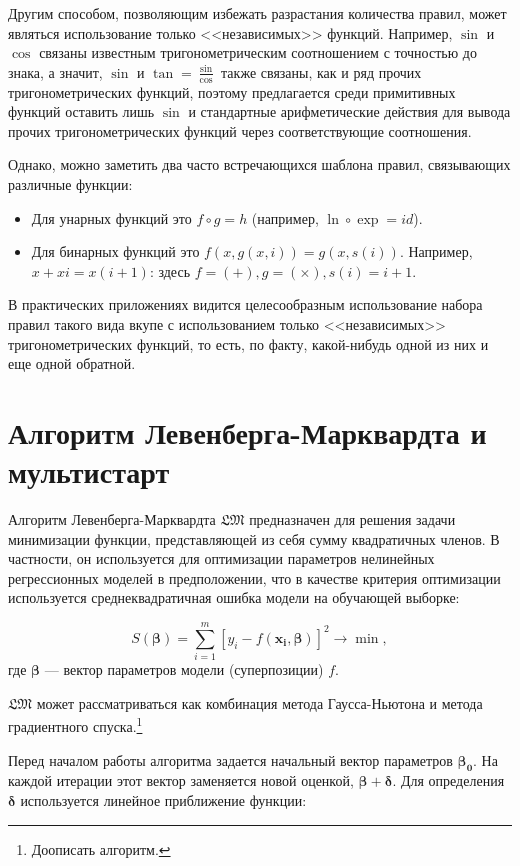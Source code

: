 \documentclass[12pt,a4paper]{amsart}
\begin{document}
Другим способом, позволяющим избежать разрастания количества правил, может
являться использование только <<независимых>> функций. Например, $\sin$ и
$\cos$ связаны известным тригонометрическим соотношением с точностью до знака,
а значит, $\sin$ и $\tan = \frac{\sin}{\cos}$ также связаны, как и ряд прочих
тригонометрических функций, поэтому предлагается среди примитивных функций
оставить лишь $\sin$ и стандартные арифметические действия для вывода прочих
тригонометрических функций через соответствующие соотношения.

Однако, можно заметить два часто встречающихся шаблона правил, связывающих
различные функции:
\begin{itemize}
  \item Для унарных функций это $f \circ g = h$ (например,
	$\ln \circ \exp = id$).
  \item Для бинарных функций это $ f (x, g (x, i)) = g (x, s (i)) $.
	Например, $x + xi = x(i+1)$: здесь $f = (+), g = (\times), s(i) = i + 1$.
\end{itemize}

В практических приложениях видится целесообразным использование набора правил
такого вида вкупе с использованием только <<независимых>> тригонометрических
функций, то есть, по факту, какой-нибудь одной из них и еще одной обратной.

\section{Алгоритм Левенберга-Марквардта и мультистарт}

Алгоритм Левенберга-Марквардта $\mathfrak{LM}$ предназначен для решения
задачи минимизации функции, представляющей из себя сумму квадратичных членов.
В частности, он используется для оптимизации параметров нелинейных регрессионных
моделей в предположении, что в качестве критерия оптимизации используется
среднеквадратичная ошибка модели на обучающей выборке:

\[
S(\mathbf{\beta}) = \sum_{i=1}^{m} [y_i - f(\mathbf{x_i}, \mathbf{\beta})]^2 \to \min,
\]
где $\mathbf{\beta}$ --- вектор параметров модели (суперпозиции) $f$.

$\mathfrak{LM}$ может рассматриваться как комбинация метода Гаусса-Ньютона и
метода градиентного спуска.\footnote{Доописать алгоритм.}

Перед началом работы алгоритма задается начальный вектор параметров $\mathbf{\beta_0}$.
На каждой итерации этот вектор заменяется новой оценкой, $\mathbf{\beta + \delta}$.
Для определения $\mathbf{\delta}$ используется линейное приближение функции:
\end{document}
